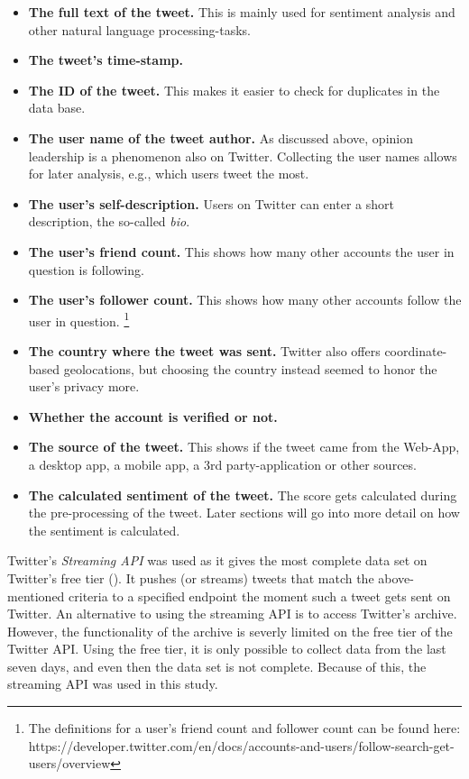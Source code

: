 \begin{itemize}
\item \textbf{The full text of the tweet.} This is mainly used for sentiment analysis and other natural language processing-tasks.
\item \textbf{The tweet's time-stamp.}
\item \textbf{The ID of the tweet.} This makes it easier to check for duplicates in the data base. 
\item \textbf{The user name of the tweet author.} As discussed above, opinion leadership is a phenomenon also on Twitter. Collecting the user names allows for later analysis, e.g., which users tweet the most.
\item \textbf{The user's self-description.} Users on Twitter can enter a short description, the so-called \emph{bio}.
\item \textbf{The user's friend count.} This shows how many other accounts the user in question is following.
\item \textbf{The user's follower count.} This shows how many other accounts follow the user in question. \footnote{The definitions for a user's friend count and follower count can be found here: https://developer.twitter.com/en/docs/accounts-and-users/follow-search-get-users/overview}
\item \textbf{The country where the tweet was sent.} Twitter also offers coordinate-based geolocations, but choosing the country instead seemed to honor the user's privacy more.
\item \textbf{Whether the account is verified or not.}
\item \textbf{The source of the tweet.} This shows if the tweet came from the Web-App, a desktop app, a mobile app, a 3rd party-application or other sources.
\item \textbf{The calculated sentiment of the tweet.} The score gets calculated during the pre-processing of the tweet. Later sections will go into more detail on how the sentiment is calculated.
\end{itemize}


Twitter's \emph{Streaming API} was used as it gives the most complete data set on Twitter's free tier (\cite{bruns2014}). It pushes (or streams) tweets that match the above-mentioned criteria to a specified endpoint the moment such a tweet gets sent on Twitter. An alternative to using the streaming API is to access Twitter's archive. However, the functionality of the archive is severly limited on the free tier of the Twitter API. Using the free tier, it is only possible to collect data from the last seven days, and even then the data set is not complete. Because of this, the streaming API was used in this study.

